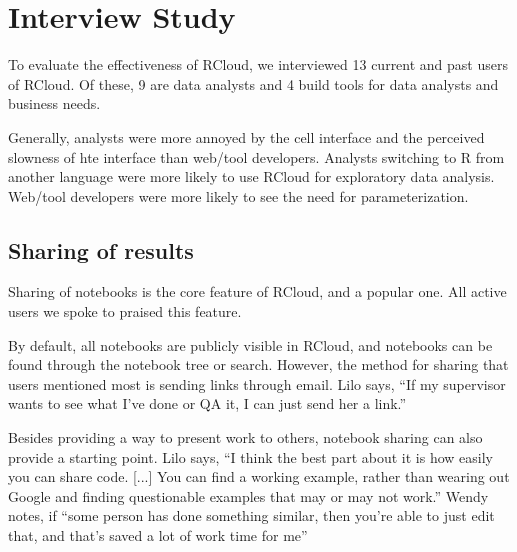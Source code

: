\section{Interview Study\label{sec:interviews}}

To evaluate the effectiveness of RCloud, we interviewed 13 current and past
users of RCloud. Of these, 9 are data analysts and 4 build tools for data
analysts and business needs.

Generally, analysts were more annoyed by the cell interface and the
perceived slowness of hte interface than web/tool developers. Analysts
switching to R from another language were more likely to use RCloud for
exploratory data analysis. Web/tool developers were more likely to see the
need for parameterization.


\subsection{Sharing of results}
Sharing of notebooks is the core feature of RCloud, and a popular one. All
active users we spoke to praised this feature.


By default, all notebooks are publicly visible in RCloud, and notebooks can be
found through the notebook tree or search. However, the method for sharing that
users mentioned most is sending links through email. Lilo says, ``If my supervisor
wants to see what I've done or QA it, I can just send her a link.''

Besides providing a way to present work to others, notebook sharing can also
provide a starting point. Lilo says, ``I think the best part about it is how
easily you can share code. [...] You can find a working example, rather than wearing
out Google and finding questionable examples that may or may not work.'' Wendy
notes, if ``some person has done something similar, then you're able to just
edit that, and that's saved a lot of work time for me''


